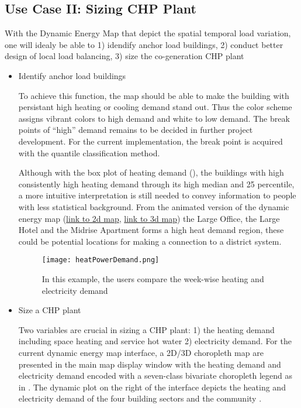 \subsection{Use Case II: Sizing CHP Plant}\label{sec:CHPsize}
With the Dynamic Energy Map that depict the spatial temporal load
variation, one will idealy be able to 1) idendify anchor load
buildings, 2) conduct better design of local load balancing, 3) size
the co-generation CHP plant

\begin{itemize}
\item Identify anchor load buildings
  
  To achieve this function, the map should be able to make the
  building with persistant high heating or cooling demand stand
  out. Thus the color scheme assigns vibrant colors to high demand and
  white to low demand. The break points of ``high'' demand remains to
  be decided in further project development. For the current
  implementation, the break point is acquired with the quantile
  classification method.

  Although with the box plot of heating demand (), the
  buildings with high consistently high heating demand through its
  high median and 25 percentile, a more intuitive interpretation is
  still needed to convey information to people with less statistical
  background. From the animated version of the dynamic energy map
  (\href{http://www.armechxyj.com/energy-mapping.html#redblueAnime2d}{link
    to 2d map},
  \href{http://www.armechxyj.com/energy-mapping.html#redblueAnime3d}{link
    to 3d map}) the Large Office, the Large Hotel and the Midrise
  Apartment forms a high heat demand region, these could be potential
  locations for making a connection to a district system.

  \begin{figure}[h!]
    \centering
    \texttt{[image: heatPowerDemand.png]}
    \caption[Comparing Community Heating and Electricity Demand]{In
      this example, the users compare the week-wise heating and
      electricity demand}
    \label{fig:heatPowerDemand}
  \end{figure}
\item Size a CHP plant 

  Two variables are crucial in sizing a CHP plant: 1) the heating
  demand including space heating and service hot water 2) electricity
  demand. For the current dynamic energy map interface, a 2D/3D
  choropleth map are presented in the main map display window with the
  heating demand and electricity demand encoded with a seven-class
  bivariate choropleth legend as in . The dynamic
  plot on the right of the interface depicts the heating and
  electricity demand of the four building sectors and the community .


\end{itemize}
